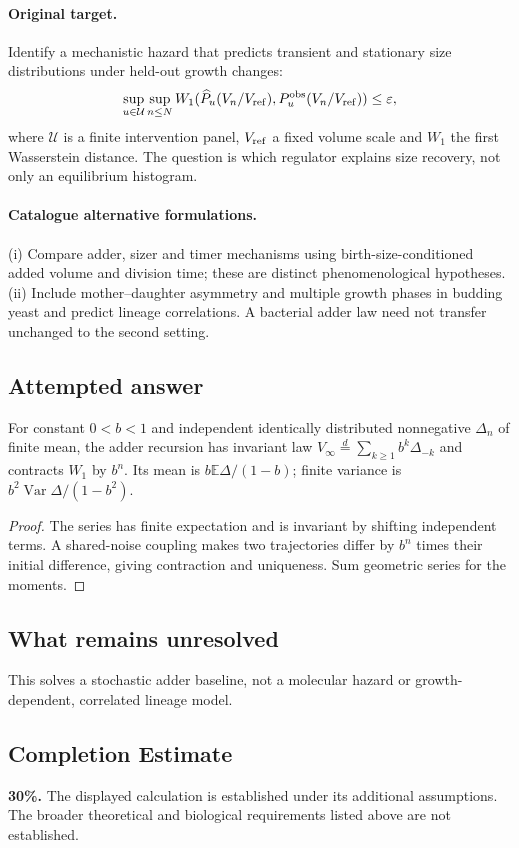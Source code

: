 \documentclass[11pt]{article}
\begin{document}
\paragraph{Original target.}
Identify a mechanistic hazard that predicts transient and stationary size distributions under held-out growth changes:
\[
\sup_{u\in\mathcal U}\sup_{n\leq N}
W_1(\widehat P_u(V_n/V_{\rm ref}),P_u^{\rm obs}(V_n/V_{\rm ref}))\leq\varepsilon,
\]
where $\mathcal U$ is a finite intervention panel, $V_{\rm ref}$ a fixed volume scale and $W_1$ the first Wasserstein distance. The question is which regulator explains size recovery, not only an equilibrium histogram.
\paragraph{Catalogue alternative formulations.}
(i) Compare adder, sizer and timer mechanisms using birth-size-conditioned added volume and division time; these are distinct phenomenological hypotheses. (ii) Include mother--daughter asymmetry and multiple growth phases in budding yeast and predict lineage correlations. A bacterial adder law need not transfer unchanged to the second setting.
\subsection{Attempted answer}
\begin{proposition}
For constant $0<b<1$ and independent identically distributed nonnegative $\Delta_n$ of finite mean, the adder recursion has invariant law $V_\infty\overset d=\sum_{k\geq1}b^k\Delta_{-k}$ and contracts $W_1$ by $b^n$. Its mean is $b\mathbb{E}\Delta/(1-b)$; finite variance is $b^2\operatorname{Var}\Delta/(1-b^2)$.
\end{proposition}
\begin{proof}
The series has finite expectation and is invariant by shifting independent terms. A shared-noise coupling makes two trajectories differ by $b^n$ times their initial difference, giving contraction and uniqueness. Sum geometric series for the moments.
\end{proof}
\subsection{What remains unresolved}
This solves a stochastic adder baseline, not a molecular hazard or growth-dependent, correlated lineage model.
\subsection{Completion Estimate}
\textbf{30\%.} The displayed calculation is established under its additional assumptions. The broader theoretical and biological requirements listed above are not established.
\end{document}
